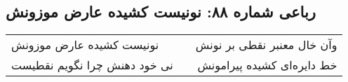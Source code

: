 \begin{center}
\section*{رباعی شماره ۸۸: نونیست کشیده عارض موزونش}
\label{sec:088}
\begin{longtable}{l p{0.5cm} r}
نونیست کشیده عارض موزونش
&&
وآن خال معنبر نقطی بر نونش
\\
نی خود دهنش چرا نگویم نقطیست
&&
خط دایره‌ای کشیده پیرامونش
\\
\end{longtable}
\end{center}
